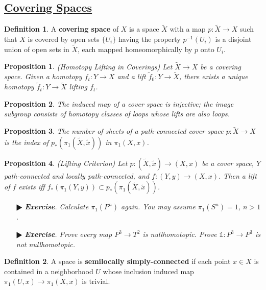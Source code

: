 \documentclass[11pt]{amsart}
\newtheorem*{proposition*}{Proposition}
\theoremstyle{definition}
\newtheorem*{definition*}{Definition}
\renewcommand\tilde{\widetilde}
\renewcommand\:{\colon}
\newcommand{\1}{\mathds{1}}
\newcommand{\exc}[1]{\vspace{-2.5pt}\begin{itemize}[leftmargin=15pt]\item[$\RHD$] \textit{\textbf{Exercise}. #1}\end{itemize}}
\begin{document}
\vskip20pt



\subsection*{\underline{Covering Spaces}}

\begin{definition*}
	A \textbf{covering space} of $X$ is a space $\tilde X$ with a map $p\: \tilde X \to X$ such that $X$ is covered by open sets $\{U_i\}$ having the property $p^{-1}(U_i)$ is a disjoint union of open sets in $\tilde X$, each mapped homeomorphically by $p$ onto $U_i$.
\end{definition*}

\begin{proposition*}
	\textnormal{(Homotopy Lifting in Coverings)} Let $\tilde X \to X$ be a covering space. Given a homotopy $f_t \: Y \to X$ and a lift $\tilde f_0\: Y \to \tilde X$, there exists a unique homotopy $\tilde f_t\: Y \to \tilde X$ lifting $f_t$.
\end{proposition*}

\begin{proposition*}
	The induced map of a cover space is injective; the image subgroup consists of homotopy classes of loops whose lifts are also loops.
\end{proposition*}

\begin{proposition*}
	The number of sheets of a path-connected cover space $p\: \tilde X \to X$  is the index of $p_*(\pi_1(\tilde X, \tilde x))$ in $\pi_1(X, x)$.
\end{proposition*}

\begin{proposition*}
	\textnormal{(Lifting Criterion)} Let $p\: (\tilde X, \tilde x) \to (X, x)$ be a cover space, $Y$ path-connected and locally path-connected, and $f\: (Y, y) \to (X, x)$. Then a lift of $f$ exists iff $f_*(\pi_1(Y, y)) \subset p_*(\pi_1(\tilde X, \tilde x))$.
\end{proposition*}

\exc{Calculate $\pi_1(P^n)$ again. You may assume $\pi_1(S^n) = 1$, $n > 1$.}
\exc{Prove every map $P^3 \to T^2$ is nullhomotopic. Prove $\1\: P^3 \to P^3$ is not nullhomotopic.}

\begin{definition*}
	A space is \textbf{semilocally simply-connected} if each point $x \in X$ is contained in a neighborhood $U$ whose inclusion induced map $\pi_1(U, x) \to \pi_1(X,x)$ is trivial.
\end{definition*}
\end{document}
